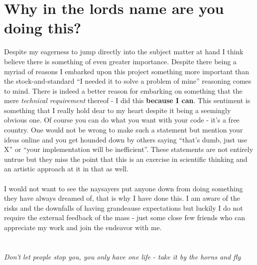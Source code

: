 
\chapter{Why in the lords name are you doing this?}

Despite my eagerness to jump directly into the subject matter at hand
I think believe there is something of even greater importance. Despite
there being a myriad of reasons I embarked upon this project something
more important than the stock-and-standard ``I needed it to solve
a problem of mine'' reasoning comes to mind. There is indeed a better
reason for embarking on something that the mere \emph{technical requirement}
thereof - I did this \textbf{because I can}. This sentiment is something
that I really hold dear to my heart despite it being a seemingly obvious
one. Of course you can do what you want with your code - it's a free
country. One would not be wrong to make such a statement but mention
your ideas online and you get hounded down by others saying ``that's
dumb, just use X'' or ``your implementation will be inefficient''.
These statements are not entirely untrue but they miss the point that
this is an exercise in scientific thinking and an artistic approach
at it in that as well.\\
\\
I would not want to see the naysayers put anyone down from doing something
they have always dreamed of, that is why I have done this. I am aware
of the risks and the downfalls of having grandeause expectations but
luckily I do not require the external feedback of the mass - just
some close few friends who can appreciate my work and join the endeavor
with me.\\
\emph{}\\
\emph{}\\
\emph{Don't let people stop you, you only have one life - take it
by the horns and fly}

